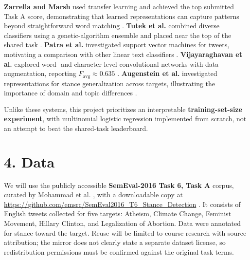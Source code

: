 \documentclass[9pt,twocolumn]{extarticle}
\begin{document}
\textbf{Zarrella and Marsh} used transfer learning and achieved the top submitted Task A score, demonstrating that learned representations can capture patterns beyond straightforward word matching \cite{zarrella2016}. \textbf{Tutek et al.} combined diverse classifiers using a genetic-algorithm ensemble and placed near the top of the shared task \cite{tutek2016}. \textbf{Patra et al.} investigated support vector machines for tweets, motivating a comparison with other linear text classifiers \cite{patra2016}. \textbf{Vijayaraghavan et al.} explored word- and character-level convolutional networks with data augmentation, reporting $F_{\mathrm{avg}}\approx0.635$ \cite{vijayaraghavan2016}. \textbf{Augenstein et al.} investigated representations for stance generalization across targets, illustrating the importance of domain and topic differences \cite{augenstein2016}.

Unlike these systems, this project prioritizes an interpretable \textbf{training-set-size experiment}, with multinomial logistic regression implemented from scratch, not an attempt to beat the shared-task leaderboard.
\section*{4. Data}
We will use the publicly accessible \textbf{SemEval-2016 Task 6, Task A} corpus, curated by Mohammad et al. \cite{mohammad2016}, with a downloadable copy at \url{https://github.com/emsrc/SemEval2016_T6_Stance_Detection} \cite{repository}. It consists of English tweets collected for five targets: Atheism, Climate Change, Feminist Movement, Hillary Clinton, and Legalization of Abortion. Data were annotated for stance toward the target. Reuse will be limited to course research with source attribution; the mirror does not clearly state a separate dataset license, so redistribution permissions must be confirmed against the original task terms.
\end{document}
